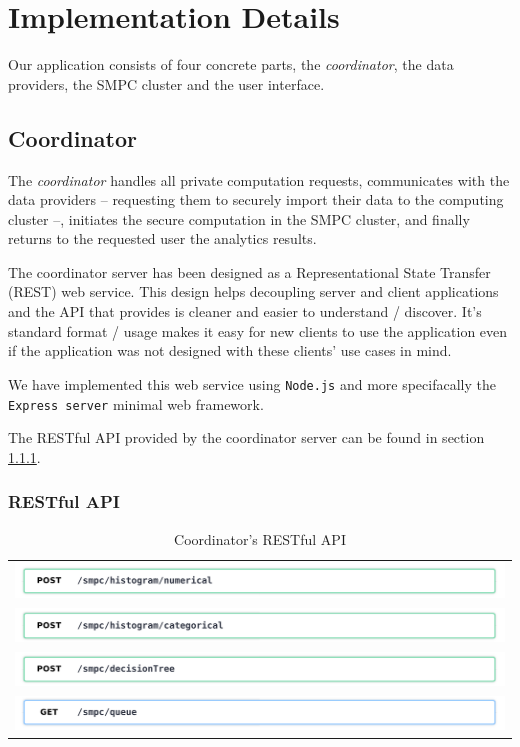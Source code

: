 \chapter{Implementation Details}\label{c:implementation}

Our application consists of four concrete parts, the \textit{coordinator}, the data providers, the SMPC cluster and the user interface.

\section{Coordinator}\label{s:impl-coordinator}
The \textit{coordinator} handles all private computation requests, communicates with the data providers -- requesting them to securely import their data to the computing cluster --, initiates the secure computation in the SMPC cluster, and finally returns to the requested user the analytics results.

The coordinator server has been designed as a Representational State Transfer (REST) web service.
This design helps decoupling server and client applications and the API that provides is cleaner and easier to understand / discover.
It's standard format / usage makes it easy for new clients to use the application even if the application was not designed with these clients' use cases in mind.

We have implemented this web service using \texttt{Node.js} and more specifacally the \texttt{Express server} minimal web framework.

The RESTful API provided by the coordinator server can be found in section \ref{ss:coord-restful-api}.


\subsection{RESTful API}\label{ss:coord-restful-api}


\begin{table}[H]
  \centering
  \caption{Coordinator's RESTful API}
  \label{t:coordinator-api}
\begin{tabular}{l}
  \includegraphics[page=1,width=\textwidth]{figures/post1.pdf} \\
  \includegraphics[page=1,width=\textwidth]{figures/post2.pdf} \\
  \includegraphics[page=1,width=\textwidth]{figures/post3.pdf} \\
  \includegraphics[page=1,width=\textwidth]{figures/get1.pdf} \\
\end{tabular}
\end{table}


